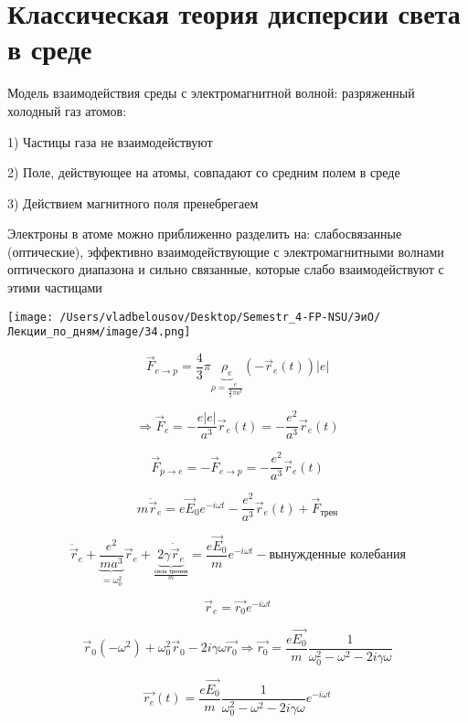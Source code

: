 \documentclass[12pt, a4paper]{report}
\begin{document}
\fi


\section{Классическая теория дисперсии света в среде}

Модель взаимодействия среды с электромагнитной волной: разряженный холодный газ атомов: 

1) Частицы газа не взаимодействуют 

2) Поле, действующее на атомы, совпадают со средним полем в среде

3) Действием магнитного поля пренебрегаем 

Электроны в атоме можно приближенно разделить на: слабосвязанные (оптические), эффективно взаимодействующие с электромагнитными волнами оптического диапазона  и сильно связанные, которые слабо взаимодействуют с этими частицами 
\begin{center}
    \texttt{[image: /Users/vladbelousov/Desktop/Semestr\_4-FP-NSU/ЭиО/Лекции\_по\_дням/image/34.png]}
\end{center}
\[ \vec{F}_{e \to p } = \frac{4}{3 }  \pi \underbrace{\rho_e}_{ \rho = \frac{e}{\frac{4 }{3 }  \pi a ^3 } } (- \vec{r }_e (t ) )|e|   \] 

\[\Rightarrow \vec{F } _e = - \frac{e |e|}{a ^3 } \vec{r}_e (t ) = - \frac{e^2 }{a^3 } \vec{r } _e (t )      \] 

\[ \vec{F } _{p \to  e } = - \vec{ F } _{e \to  p } = - \frac{e ^2 } { a ^3 }\vec{r } _e (t )    \] 

\[ m\ddot{\vec{r}  }_e = e \vec{E }  _0 e ^{- i \omega t } - \frac{e^ 2 }{a ^3 }   \vec{r } _e(t ) +\vec{F } _{\text{трен} }    \] 

\[ \ddot{\vec{r } }_e + \underbrace{\frac{e ^2 }{m a^ 3}}_{= \omega_0 ^2 } \vec{r } _e +\underbrace{2 \gamma \dot{\vec{r } }_e}_{\frac{\text{сила трения} }{m} } = \frac{e \vec{E } _0 }{m }e^{- i \omega t }  -\text{вынужденные колебания}    \] 

\[ \vec{r        }_e  = \vec{r_0 } e^{- i \omega t }    \] 

\[ \vec{r } _{0 } ( -\omega ^2 ) + \omega_0^2 \vec{r } _0 - 2 i \gamma \omega \vec{r_0} \Rightarrow \vec{r_0 } = \frac{e \vec{E_0 } }{m } \frac{1}{\omega_0 ^2 - \omega ^2 - 2 i \gamma \omega}      \] 

\[ \vec{r_e } (t )  =\frac{e \vec{E_0 } }{m }\frac{1}{\omega_0 ^2 - \omega ^2 - 2 i \gamma \omega} e^{- i \omega t }    \] 
\end{document}
